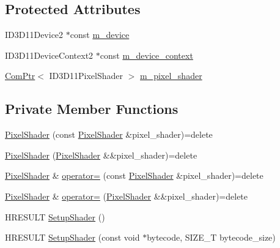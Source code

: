 \subsection*{Protected Attributes}
\begin{DoxyCompactItemize}
\item 
I\+D3\+D11\+Device2 $\ast$const \hyperlink{classmage_1_1_pixel_shader_a7fa34f27d8f39db2403edac28ddecc68}{m\+\_\+device}
\item 
I\+D3\+D11\+Device\+Context2 $\ast$const \hyperlink{classmage_1_1_pixel_shader_a6b9bbf18f255b061fb75453f32a78720}{m\+\_\+device\+\_\+context}
\item 
\hyperlink{namespacemage_ae74f374780900893caa5555d1031fd79}{Com\+Ptr}$<$ I\+D3\+D11\+Pixel\+Shader $>$ \hyperlink{classmage_1_1_pixel_shader_a1dd0f87be1c1f7fe5a1bb2737263222f}{m\+\_\+pixel\+\_\+shader}
\end{DoxyCompactItemize}
\subsection*{Private Member Functions}
\begin{DoxyCompactItemize}
\item 
\hyperlink{classmage_1_1_pixel_shader_a361df943e40e9015ac4b769af130ce79}{Pixel\+Shader} (const \hyperlink{classmage_1_1_pixel_shader}{Pixel\+Shader} \&pixel\+\_\+shader)=delete
\item 
\hyperlink{classmage_1_1_pixel_shader_aea7c5c1888dda0317d6e98d0a57c41b0}{Pixel\+Shader} (\hyperlink{classmage_1_1_pixel_shader}{Pixel\+Shader} \&\&pixel\+\_\+shader)=delete
\item 
\hyperlink{classmage_1_1_pixel_shader}{Pixel\+Shader} \& \hyperlink{classmage_1_1_pixel_shader_ac3a3535b2751237f4aad110dca05d0c3}{operator=} (const \hyperlink{classmage_1_1_pixel_shader}{Pixel\+Shader} \&pixel\+\_\+shader)=delete
\item 
\hyperlink{classmage_1_1_pixel_shader}{Pixel\+Shader} \& \hyperlink{classmage_1_1_pixel_shader_aaeab6f6fda7d6e1f7d333da03d58daf9}{operator=} (\hyperlink{classmage_1_1_pixel_shader}{Pixel\+Shader} \&\&pixel\+\_\+shader)=delete
\item 
H\+R\+E\+S\+U\+LT \hyperlink{classmage_1_1_pixel_shader_adb9c1f330ef9958a7fc46c40c98a2b57}{Setup\+Shader} ()
\item 
H\+R\+E\+S\+U\+LT \hyperlink{classmage_1_1_pixel_shader_a3df5b0c0eee682dad0406409e6df2a11}{Setup\+Shader} (const void $\ast$bytecode, S\+I\+Z\+E\+\_\+T bytecode\+\_\+size)
\end{DoxyCompactItemize}


